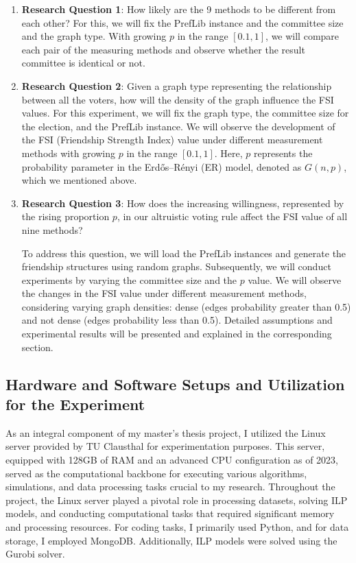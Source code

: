 \documentclass{article}
\begin{document}
\begin{enumerate}
    \item \textbf{Research Question 1}: How likely are the 9 methods to be different from each other?
        \newline
    For this, we will fix the PrefLib instance and the committee size and the graph type. With growing $p$ in the range $[0.1,1]$, we will compare each pair of the measuring methods and observe whether the result committee is identical or not.
    \item \textbf{Research Question 2}: Given a graph type representing the relationship between all the voters, how will the density of the graph influence the FSI values. 
    \newline
For this experiment, we will fix the graph type, the committee size for the election, and the PrefLib instance. We will observe the development of the FSI (Friendship Strength Index) value under different measurement methods with growing $p$ in the range $[0.1,1]$. Here, $p$ represents the probability parameter in the Erdős–Rényi (ER) model, denoted as $G(n,p)$, which we mentioned above.

    
    \item \textbf{Research Question 3}: How does the increasing willingness, represented by the rising proportion \( p \), in our altruistic voting rule affect the FSI value of all nine methods?

    To address this question, we will load the PrefLib instances and generate the friendship structures using random graphs. Subsequently, we will conduct experiments by varying the committee size and the \( p \) value. We will observe the changes in the FSI value under different measurement methods, considering varying graph densities: dense (edges probability greater than 0.5) and not dense (edges probability less than 0.5). Detailed assumptions and experimental results will be presented and explained in the corresponding section.

\end{enumerate}

\subsection{Hardware and Software Setups and Utilization for the Experiment}

As an integral component of my master's thesis project, I utilized the Linux server provided by TU Clausthal for experimentation purposes. This server, equipped with 128GB of RAM and an advanced CPU configuration as of 2023, served as the computational backbone for executing various algorithms, simulations, and data processing tasks crucial to my research. Throughout the project, the Linux server played a pivotal role in processing datasets, solving ILP models, and conducting computational tasks that required significant memory and processing resources. For coding tasks, I primarily used Python, and for data storage, I employed MongoDB. Additionally, ILP models were solved using the Gurobi solver.
\end{document}
